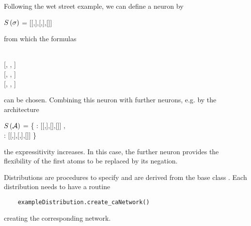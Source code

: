 \begin{example}
    Following the wet street example, we can define a neuron by
    \begin{centeredcode}
        $S\left(\sigma\right)$ = [[,],[,],[]]
    \end{centeredcode}
    from which the formulas
    \begin{centeredcode}
         \\
		\hspace{0.25cm} [, , ] \\
		\hspace{1cm}[, , ] \\
		\hspace{1cm}[, , ]
    \end{centeredcode}
    can be chosen.
    Combining this neuron with further neurons, e.g. by the architecture
    \begin{centeredcode}
        $S\left(\mathcal{A}\right)$ = \{ : [[,],[],[]] , \\
		\hspace{1.8cm}: [[,],[,],[]] \}
    \end{centeredcode}
    the expressitivity increases.
    In this case, the further neuron provides the flexibility of the first atoms to be replaced by its negation.
\end{example}




Distributions are procedures to specify  and are derived from the base class .
Each distribution needs to have a routine
\begin{lstlisting}
	exampleDistribution.create_caNetwork()
\end{lstlisting}
creating the corresponding network.

